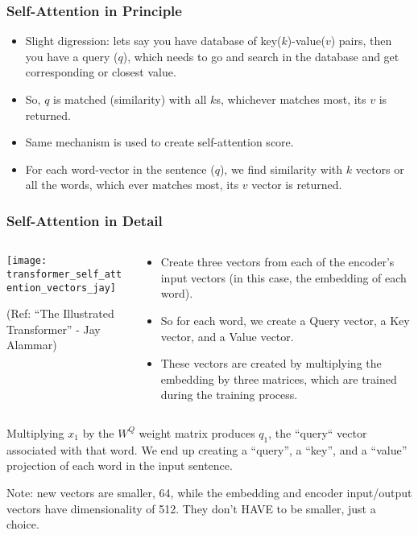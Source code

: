 \begin{frame}[fragile]\frametitle{Self-Attention in Principle}


\begin{itemize}
\item Slight digression: lets say you have database of key($k$)-value($v$) pairs, then you have a query ($q$), which needs to go and search in the database and get corresponding or closest value.
\item So, $q$ is matched (similarity) with all $k$s, whichever matches most, its $v$ is returned.
\item Same mechanism is used to create self-attention score.
\item For each word-vector in the sentence ($q$), we find similarity with $k$ vectors or all the words, which ever matches most, its $v$ vector is returned.
\end{itemize}

\end{frame}

\begin{frame}[fragile]\frametitle{Self-Attention in Detail}

\begin{columns}
    \begin{column}[T]{0.5\linewidth}
\begin{center}
\texttt{[image: transformer\_self\_attention\_vectors\_jay]}


{\tiny (Ref: ``The Illustrated Transformer'' - Jay Alammar)}
\end{center}		

		\end{column}
    \begin{column}[T]{0.5\linewidth}

\begin{itemize}
\item Create three vectors from each of the encoder’s input vectors (in this case, the embedding of each word). 
\item So for each word, we create a Query vector, a Key vector, and a Value vector. \item These vectors are created by multiplying the embedding by three matrices, which are trained during the training process.
\end{itemize}
    \end{column}
  \end{columns}
  
  Multiplying $x_1$ by the $W^Q$ weight matrix produces $q_1$, the ``query`` vector associated with that word. We end up creating a ``query'', a ``key'', and a ``value'' projection of each word in the input sentence.
  
  Note: new vectors are smaller, 64, while the embedding and encoder input/output vectors have dimensionality of 512. They don’t HAVE to be smaller, just a choice.
\end{frame}

